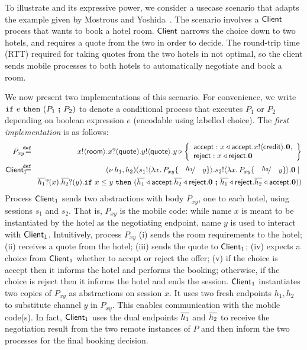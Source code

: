\documentclass[a4paper,UKenglish]{lipics}
\theoremstyle{definition}
\begin{document}
\begin{example}\label{exam:proc}
To illustrate \HOp and its expressive power, 
we consider a usecase scenario that adapts the example given by Mostrous and Yoshida~\cite{tlca07,MostrousY15}.
The scenario involves a $\mathsf{Client}$ process that wants to book
a hotel room. %
$\mathsf{Client}$
narrows the choice down to two hotels, and requires 
 a quote from the two in order to
decide. The round-trip time (RTT) required for
taking quotes from the two hotels in not optimal, %
so the client sends mobile processes to both hotels
to automatically negotiate and book a room. 

We now present two \HOp implementations of this scenario.
For convenience, we write $\mathtt{if}\  e\ \mathtt{then}\  (P_1\ \boldsymbol{;} \ P_2)$ 
to denote a conditional process that executes $P_1$ or $P_2$ depending on boolean expression $e$ (encodable using labelled choice).
The \emph{first implementation} is  as follows:
%
	\begin{eqnarray*}%
		 P_{xy}  \!\!\! & \defeq &  \!\!\! \bout{x}{\rtype} \binp{x}{\Quote} \bout{y}{\Quote}
		y \triangleright \left\{
				\begin{array}{l}
					\accept: \bsel{x}{\accept} \bout{x}{\creditc} \inact,\\
					\reject: \bsel{x}{\reject} \inact
				\end{array}
				\right\}
		\\ %
		 \Client_1 \!\!\!\!\! & \defeq  &  \!\!\! \newsp{h_1, h_2}{\bout{s_1}{\abs{x}{P_{xy} \subst{h_1}{y}}} \bout{s_2}{\abs{x}{P_{xy} \subst{h_2}{y}}} \inact \Par  \\
		& & 
		\!\!\! \binp{\dual{h_1}}{x} \binp{\dual{h_2}}{y}  \If x \leq y\   \Then (\bsel{\dual{h_1}}{\accept} \bsel{\dual{h_2}}{\reject} \inact \ \Else \ \bsel{\dual{h_1}}{\reject} \bsel{\dual{h_2}}{\accept} \inact )
		}
	\end{eqnarray*}
%
Process $\mathsf{Client}_1$ sends two abstractions with body $P_{xy}$, one to each hotel, 
		using sessions $s_1$ and $s_2$.
		That is, $P_{xy}$ is the mobile code:
	while
		name $x$ is meant to be instantiated by the hotel as the negotiating
		endpoint, name $y$ is used to interact with $\mathsf{Client}_1$.	
		Intuitively, process $P_{xy}$ (i)  sends the room requirements to the hotel;
		(ii) receives a quote from the hotel;
		(iii) sends the quote to  $\mathsf{Client}_1$;
		(iv) expects a choice from   $\mathsf{Client}_1$ whether to accept or reject the offer;
		(v) if the choice is accept then it informs the hotel and performs the booking;
		otherwise, if the choice is reject then it informs the hotel and ends the session.
				$\mathsf{Client}_1$ instantiates two copies of  $P_{xy}$ as abstractions
		on session $x$. It uses two
		fresh endpoints $h_1, h_2$ to substitute channel $y$
		in $P_{xy}$. This enables communication with the mobile code(s).
		In fact, 
		$\mathsf{Client}_1$ uses the dual endpoints $\overline{h_1}$ and $\overline{h_2}$
		to receive the negotiation
		result from the two remote instances of $P$ and then inform the two
		processes for the final booking decision.


\end{example}
\end{document}
